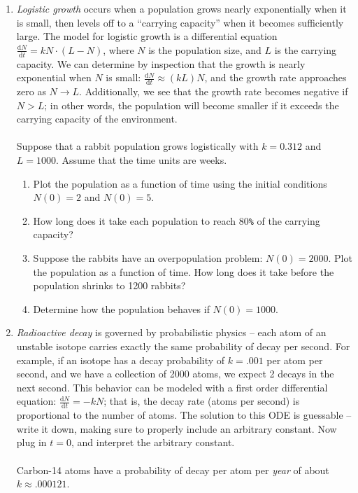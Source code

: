 \documentclass[10.5pt,twoside]{report}
\theoremstyle{definition}
\begin{document}
\begin{enumerate}
\item  \textit{Logistic growth} occurs when a population grows nearly exponentially when it is small, then levels off to a ``carrying capacity'' when it becomes sufficiently large.  The model for logistic growth is a differential equation $\frac{\mathrm{d}N}{\mathrm{d}t}=kN\cdot (L-N)$, where $N$ is the population size, and $L$ is the carrying capacity.  We can determine by inspection that the growth is nearly exponential when $N$ is small:   $\frac{\mathrm{d}N}{\mathrm{d}t}\approx (kL)N$, and the growth rate approaches zero as $N\to L$.  Additionally, we see that the growth rate becomes negative if $N>L$; in other words, the population will become smaller if it exceeds the carrying capacity of the environment.  \\
${}$\\
Suppose that a rabbit population grows logistically with $k=0.312$ and $L=1000$.  Assume that the time units are weeks.

 \begin{enumerate}
 
  \item Plot the population as a function of time using the initial conditions $N(0)=2$ and $N(0)=5$.  

  \item How long does it take each population to reach 80\verb|%| of the carrying capacity?
  
  \item Suppose the rabbits have an overpopulation problem:  $N(0)=2000$.  Plot the population as a function of time.  How long does it take before the population shrinks to 1200 rabbits?
  
  \item Determine how the population behaves if $N(0)=1000$.
 \end{enumerate}
 
\item  \textit{Radioactive decay} is governed by probabilistic physics -- each atom of an unstable isotope carries exactly the same probability of decay per second.  For example, if an isotope has a decay probability of $k=.001$ per atom per second, and we have a collection of 2000 atoms, we expect 2 decays in the next second.  This behavior can be modeled with a first order differential equation:  $\frac{\mathrm{d}N}{\mathrm{d}t}=-kN$; that is, the decay rate (atoms per second) is proportional to the number of atoms.  The solution to this ODE is guessable -- write it down, making sure to properly include an arbitrary constant.  Now plug in $t=0$, and interpret the arbitrary constant.  \\
${}$\\
Carbon-14 atoms have a probability of decay per atom per \textit{year} of about $k\approx .000121$.  


\end{enumerate}
\end{document}
